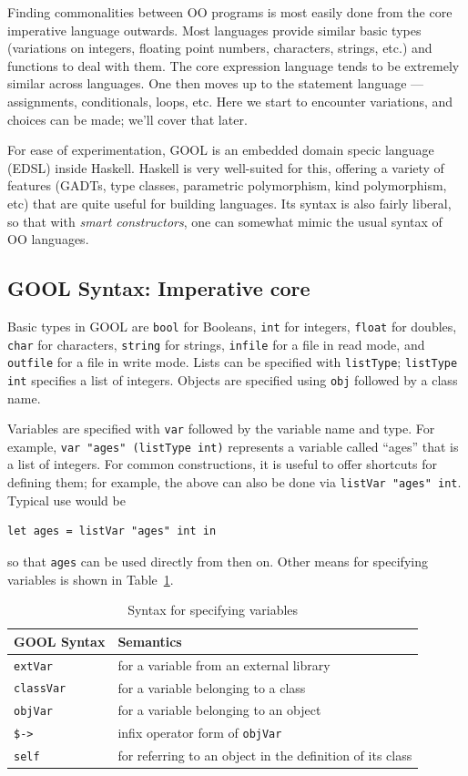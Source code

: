\documentclass[sigplan,review,anonymous,prologue,dvipsnames]{acmart}
\begin{document}
Finding commonalities between OO programs is most easily done from the core 
imperative language outwards.
Most languages provide similar basic types (variations on integers,
floating point numbers, characters, strings, etc.) and functions to deal
with them. The core expression language tends to be extremely similar
across languages. One then moves up to the statement language ---
assignments, conditionals, loops, etc.  Here we start to encounter
variations, and choices can be made; we'll cover that later.

For ease of experimentation, GOOL is an embedded
domain specic language (EDSL) inside Haskell.  Haskell is very well-suited
for this, offering a variety of features (GADTs, type classes,
parametric polymorphism, kind polymorphism, etc) that are quite useful
for building languages.  Its syntax is also fairly liberal, so that
with \emph{smart constructors}, one can somewhat mimic the
usual syntax of OO languages.

\subsection{GOOL Syntax: Imperative core} \label{ssec:syntax}

Basic types in GOOL are \verb|bool| for Booleans,
\verb|int| for integers, \verb|float| for doubles, \verb|char|
for characters, \verb|string| for strings, \verb|infile| for a file
in read mode, and \verb|outfile| for a file in write mode. Lists can be
specified with \verb|listType|; \verb|listType int|
specifies a list of integers. Objects are specified using
\verb|obj| followed by a class name.

Variables are specified with \verb|var| followed by the variable name and type.
For example, \verb|var "ages" (listType int)| represents a variable called
``ages'' that is a list of integers.  For common constructions,
it is useful to offer shortcuts for
defining them; for example, the above can also be done via
\verb|listVar "ages" int|. Typical use would be
\begin{lstlisting}
let ages = listVar "ages" int in
\end{lstlisting}
so that \verb|ages| can be used directly from then on. Other means for
specifying variables is shown in Table~\ref{tab:variables}.

\begin{table}[ht]
\caption{Syntax for specifying variables}
\begin{tabular}{p{} p{}}
  \textbf{GOOL Syntax} & \textbf{Semantics} \\
  \midrule
  \verb|extVar| & for a variable from an external library \\
  \verb|classVar| & for a variable belonging to a class \\
  \verb|objVar| & for a variable belonging to an object \\
  \verb|$->| & infix operator form of \verb|objVar| \\
  \verb|self| & for referring to an object in the definition of its class \\
\end{tabular}
\label{tab:variables}
\end{table}
\end{document}
